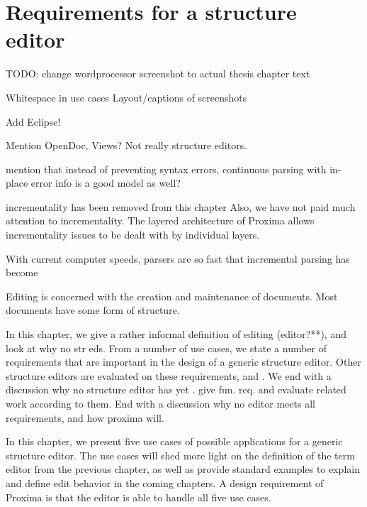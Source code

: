 \chapter{Requirements for a structure editor}
\label{chap:requirements}



\bc

TODO: change wordprocessor screenshot to actual thesis chapter text

Whitespace in use cases
Layout/captions of screenshots

Add Eclipse!





Mention OpenDoc, Views? Not really structure editors.

mention that instead of preventing syntax errors, continuous parsing with in-place error 
info is a good model as well?

incrementality  has been removed from this chapter
Also, we have not paid much attention to incrementality. The layered architecture of Proxima allows incrementality issues to be dealt with by individual layers. 

With current computer speeds, parsers are so fast that incremental parsing has become %
\ec

\bc
Editing is concerned with the creation and maintenance of documents.  
Most documents have some form of structure. 

In this chapter, we give a rather informal definition of editing (editor?**), and look at why no str eds. From a number of use cases, we state a number of requirements that are important in the design of a generic structure editor. Other structure editors are evaluated on these requirements, and . We end with a discussion why no structure editor has yet .  give fun. req. and evaluate related work according to them. End with a discussion why no editor meets all requirements, and how proxima will.
\ec

In this chapter, we present five use cases of possible applications for a generic structure editor. The use cases will shed more light on the definition of the term editor from the previous chapter, as well as provide standard examples to explain and define edit behavior in the coming chapters. A design requirement of Proxima is that the editor is able to handle all five use cases. 

